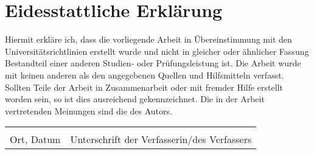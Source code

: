 
\section*{Eidesstattliche Erklärung}

Hiermit erkläre ich, dass die vorliegende Arbeit in Übereinstimmung mit den Universitätsrichtlinien erstellt wurde und nicht in gleicher oder ähnlicher Fassung Bestandteil einer anderen Studien- oder Prüfungsleistung ist. Die Arbeit wurde mit keinen anderen als den angegebenen Quellen und Hilfsmitteln verfasst. Sollten Teile der Arbeit in Zusammenarbeit oder mit fremder Hilfe erstellt worden sein, so ist dies ausreichend gekennzeichnet. Die in der Arbeit vertretenden Meinungen sind die des Autors.\\

\vspace{3 cm}

\begin{tabular}{ll}
	\makebox[0.3\textwidth]{\hrulefill} & \makebox[0.6\textwidth]{\hrulefill}\\
	Ort, Datum & Unterschrift der Verfasserin/des Verfassers
\end{tabular}